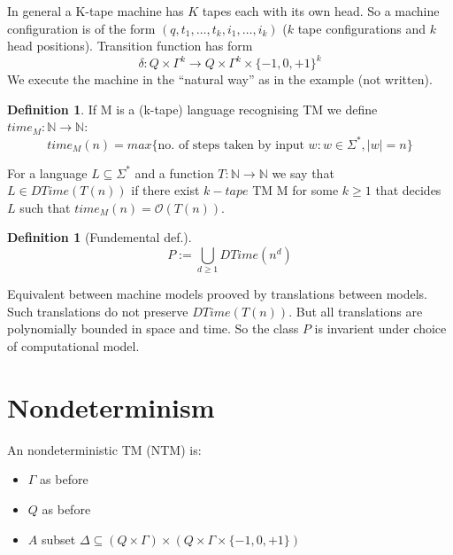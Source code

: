 \documentclass[a4paper,12pt]{article}
\theoremstyle{definition}
\newtheorem{definition}[counter]{Definition}
\theoremstyle{remark}
\newcommand{\N}{\mathbb{N}}
\begin{document}
In general a K-tape machine has $K$ tapes each with its own head. So a machine configuration is of the form 
$(q, t_1, \dots, t_k, i_1, \dots, i_k)$ ($k$ tape configurations and $k$ head positions).
Transition function has form
\begin{equation*}
    \delta: Q \times \Gamma^k \to Q \times \Gamma^k \times \{-1, 0, +1\}^k
\end{equation*}
We execute the machine in the ``natural way'' as in the example (not written).

\begin{definition}
    If M is a (k-tape) language recognising TM we define $time_M: \N \to \N$:
    \begin{equation*}
        time_M(n) = max \{\text{no. of steps taken by input }w: w \in \Sigma^*,  |w| = n\}
    \end{equation*}

    For a language $L \subseteq \Sigma^*$ and a function $T: \N \to \N$ we say that $L \in DTime(T(n))$ if there exist $k-tape$ TM M for
    some $k \geq 1$ that decides $L$ such that $time_M(n) = \mathscr{O}(T(n))$.
\end{definition}

\begin{definition}[Fundemental def.]
    \begin{equation*}
        P := \bigcup\limits_{d \geq 1} DTime(n^d)
    \end{equation*}
\end{definition}

Equivalent between machine models prooved by translations between models. Such translations do not preserve $DTime(T(n))$. But 
all translations are polynomially bounded in space and time. So the class $P$ is invarient under choice of computational model.






\newpage
\section{Nondeterminism}
An nondeterministic TM (NTM) is:
\begin{itemize}
    \item $\Gamma$ as before
    \item $Q$ as before
    \item $A$ subset $\Delta \subseteq (Q \times \Gamma) \times (Q \times \Gamma \times \{-1, 0, +1\})$
\end{itemize}
\end{document}
